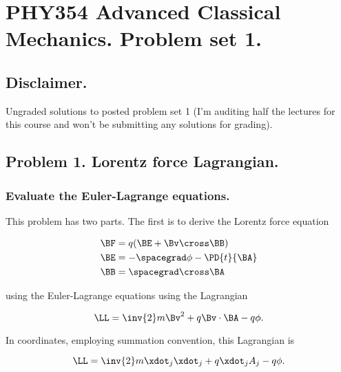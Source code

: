 
%

\chapter{PHY354 Advanced Classical Mechanics.  Problem set 1.}
\label{chap:classicalMechanicsPs1}
{}
\date{Jan 24, 2012}

\beginArtWithToc

\section{Disclaimer.}

Ungraded solutions to posted problem set 1 (I'm auditing half the lectures for this course and won't be submitting any solutions for grading).

\section{Problem 1.  Lorentz force Lagrangian.}
\subsection{Evaluate the Euler-Lagrange equations.}

This problem has two parts.   The first is to derive the Lorentz force equation

\begin{align}\label{eqn:classicalMechanicsPs1:20}
\BF &= q (\BE + \Bv \cross \BB) \\
\BE &= -\spacegrad \phi - \PD{t}{\BA} \\
\BB &= \spacegrad \cross \BA
\end{align}

using the Euler-Lagrange equations using the Lagrangian

\begin{equation}\label{eqn:classicalMechanicsPs1:40}
\LL = \inv{2} m \Bv^2 + q \Bv \cdot \BA - q \phi.
\end{equation}

In coordinates, employing summation convention, this Lagrangian is

\begin{equation}\label{eqn:classicalMechanicsPs1:60}
\LL = \inv{2} m \xdot_j \xdot_j + q \xdot_j A_j - q \phi.
\end{equation}

